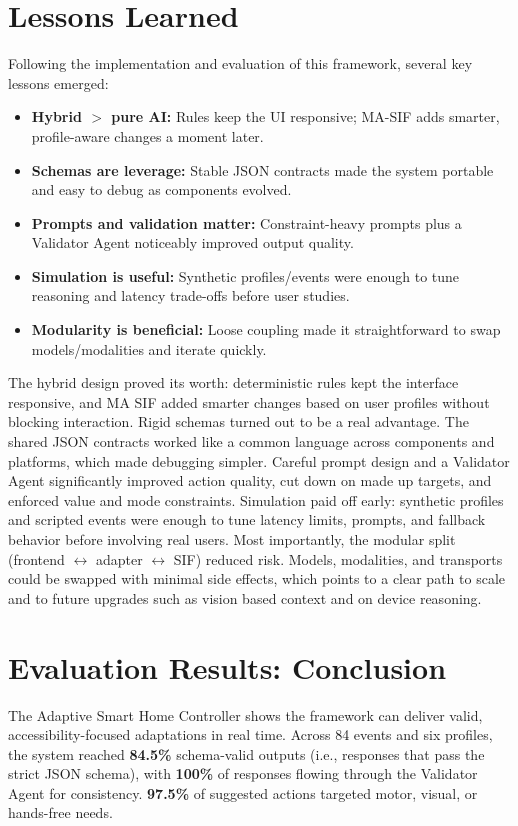\documentclass[openany]{book}
\begin{document}
\section{Lessons Learned}
Following the implementation and evaluation of this framework, several key lessons emerged:
\begin{itemize}
    \item \textbf{Hybrid $>$ pure AI:} Rules keep the UI responsive; MA-SIF adds smarter, profile-aware changes a moment later.
    \item \textbf{Schemas are leverage:} Stable JSON contracts made the system portable and easy to debug as components evolved.
    \item \textbf{Prompts and validation matter:} Constraint-heavy prompts plus a Validator Agent noticeably improved output quality.
    \item \textbf{Simulation is useful:} Synthetic profiles/events were enough to tune reasoning and latency trade-offs before user studies.
    \item \textbf{Modularity is beneficial:} Loose coupling made it straightforward to swap models/modalities and iterate quickly.
\end{itemize}
The hybrid design proved its worth: deterministic rules kept the interface responsive, and MA SIF added smarter changes based on user profiles without blocking interaction. Rigid schemas turned out to be a real advantage. The shared JSON contracts worked like a common language across components and platforms, which made debugging simpler. Careful prompt design and a Validator Agent significantly improved action quality, cut down on made up targets, and enforced value and mode constraints. Simulation paid off early: synthetic profiles and scripted events were enough to tune latency limits, prompts, and fallback behavior before involving real users. Most importantly, the modular split (frontend $\leftrightarrow$ adapter $\leftrightarrow$ SIF) reduced risk. Models, modalities, and transports could be swapped with minimal side effects, which points to a clear path to scale and to future upgrades such as vision based context and on device reasoning.

\section{Evaluation Results: Conclusion}
The Adaptive Smart Home Controller shows the framework can deliver valid, accessibility-focused adaptations in real time. Across 84 events and six profiles, the system reached \textbf{84.5\%} schema-valid outputs (i.e., responses that pass the strict JSON schema), with \textbf{100\%} of responses flowing through the Validator Agent for consistency. \textbf{97.5\%} of suggested actions targeted motor, visual, or hands-free needs.
\end{document}
